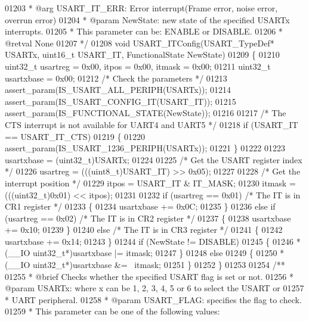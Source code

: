 \begin{DoxyCode}
01203 \textcolor{comment}{  *            @arg USART\_IT\_ERR:  Error interrupt(Frame error, noise error, overrun error)}
01204 \textcolor{comment}{  * @param  NewState: new state of the specified USARTx interrupts.}
01205 \textcolor{comment}{  *          This parameter can be: ENABLE or DISABLE.}
01206 \textcolor{comment}{  * @retval None}
01207 \textcolor{comment}{  */}
01208 \textcolor{keywordtype}{void} USART_ITConfig(USART\_TypeDef* USARTx, uint16\_t USART\_IT, FunctionalState NewState)
01209 \{
01210   uint32\_t usartreg = 0x00, itpos = 0x00, itmask = 0x00;
01211   uint32\_t usartxbase = 0x00;
01212   \textcolor{comment}{/* Check the parameters */}
01213   assert_param(IS\_USART\_ALL\_PERIPH(USARTx));
01214   assert_param(IS\_USART\_CONFIG\_IT(USART\_IT));
01215   assert_param(IS\_FUNCTIONAL\_STATE(NewState));
01216 
01217   \textcolor{comment}{/* The CTS interrupt is not available for UART4 and UART5 */}
01218   \textcolor{keywordflow}{if} (USART\_IT == USART_IT_CTS)
01219   \{
01220     assert_param(IS\_USART\_1236\_PERIPH(USARTx));
01221   \}
01222 
01223   usartxbase = (uint32\_t)USARTx;
01224 
01225   \textcolor{comment}{/* Get the USART register index */}
01226   usartreg = (((uint8\_t)USART\_IT) >> 0x05);
01227 
01228   \textcolor{comment}{/* Get the interrupt position */}
01229   itpos = USART\_IT & IT_MASK;
01230   itmask = (((uint32\_t)0x01) << itpos);
01231 
01232   \textcolor{keywordflow}{if} (usartreg == 0x01) \textcolor{comment}{/* The IT is in CR1 register */}
01233   \{
01234     usartxbase += 0x0C;
01235   \}
01236   \textcolor{keywordflow}{else} \textcolor{keywordflow}{if} (usartreg == 0x02) \textcolor{comment}{/* The IT is in CR2 register */}
01237   \{
01238     usartxbase += 0x10;
01239   \}
01240   \textcolor{keywordflow}{else} \textcolor{comment}{/* The IT is in CR3 register */}
01241   \{
01242     usartxbase += 0x14;
01243   \}
01244   \textcolor{keywordflow}{if} (NewState != DISABLE)
01245   \{
01246     *(\_\_IO uint32\_t*)usartxbase  |= itmask;
01247   \}
01248   \textcolor{keywordflow}{else}
01249   \{
01250     *(\_\_IO uint32\_t*)usartxbase &= ~itmask;
01251   \}
01252 \}
01253 
01254 \textcolor{comment}{/**}
01255 \textcolor{comment}{  * @brief  Checks whether the specified USART flag is set or not.}
01256 \textcolor{comment}{  * @param  USARTx: where x can be 1, 2, 3, 4, 5 or 6 to select the USART or }
01257 \textcolor{comment}{  *         UART peripheral.}
01258 \textcolor{comment}{  * @param  USART\_FLAG: specifies the flag to check.}
01259 \textcolor{comment}{  *          This parameter can be one of the following values:}

\end{DoxyCode}
